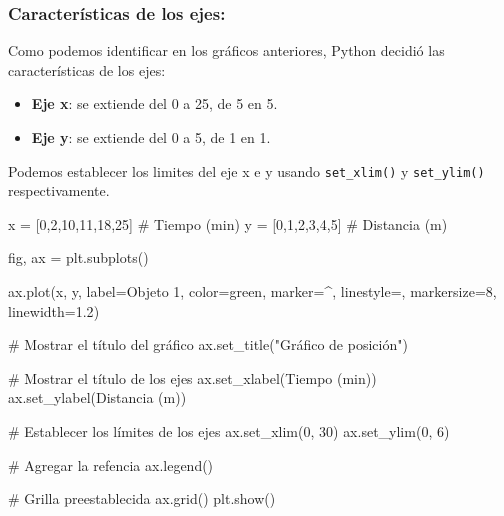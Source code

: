 \documentclass[
  letterpaper,
  DIV=11,
  numbers=noendperiod]{scrreprt}
\newenvironment{Shaded}{\begin{snugshade}}{\end{snugshade}}
\newcommand{\CommentTok}[1]{\textcolor[rgb]{0.37,0.37,0.37}{#1}}
\newcommand{\DecValTok}[1]{\textcolor[rgb]{0.68,0.00,0.00}{#1}}
\newcommand{\FloatTok}[1]{\textcolor[rgb]{0.68,0.00,0.00}{#1}}
\newcommand{\NormalTok}[1]{\textcolor[rgb]{0.00,0.23,0.31}{#1}}
\newcommand{\OperatorTok}[1]{\textcolor[rgb]{0.37,0.37,0.37}{#1}}
\newcommand{\StringTok}[1]{\textcolor[rgb]{0.13,0.47,0.30}{#1}}
\providecommand{\tightlist}{%
  \setlength{\itemsep}{0pt}\setlength{\parskip}{0pt}}\usepackage{longtable,booktabs,array}
\begin{document}
\subsubsection{Características de los
ejes:}\label{caracteruxedsticas-de-los-ejes}

Como podemos identificar en los gráficos anteriores, Python decidió las
características de los ejes:

\begin{itemize}
\tightlist
\item
  \textbf{Eje x}: se extiende del 0 a 25, de 5 en 5.
\item
  \textbf{Eje y}: se extiende del 0 a 5, de 1 en 1.
\end{itemize}

Podemos establecer los limites del eje x e y usando \texttt{set\_xlim()}
y \texttt{set\_ylim()} respectivamente.

\begin{Shaded}
\begin{Highlighting}[]
\NormalTok{x }\OperatorTok{=}\NormalTok{ [}\DecValTok{0}\NormalTok{,}\DecValTok{2}\NormalTok{,}\DecValTok{10}\NormalTok{,}\DecValTok{11}\NormalTok{,}\DecValTok{18}\NormalTok{,}\DecValTok{25}\NormalTok{]   }\CommentTok{\# Tiempo (min)}
\NormalTok{y }\OperatorTok{=}\NormalTok{ [}\DecValTok{0}\NormalTok{,}\DecValTok{1}\NormalTok{,}\DecValTok{2}\NormalTok{,}\DecValTok{3}\NormalTok{,}\DecValTok{4}\NormalTok{,}\DecValTok{5}\NormalTok{]       }\CommentTok{\# Distancia (m)}

\NormalTok{fig, ax }\OperatorTok{=}\NormalTok{ plt.subplots()}

\NormalTok{ax.plot(x, y, label}\OperatorTok{=}\StringTok{\textquotesingle{}Objeto 1\textquotesingle{}}\NormalTok{, color}\OperatorTok{=}\StringTok{\textquotesingle{}green\textquotesingle{}}\NormalTok{, marker}\OperatorTok{=}\StringTok{\textquotesingle{}\^{}\textquotesingle{}}\NormalTok{, linestyle}\OperatorTok{=}\StringTok{\textquotesingle{}{-}{-}\textquotesingle{}}\NormalTok{,}
\NormalTok{        markersize}\OperatorTok{=}\DecValTok{8}\NormalTok{, linewidth}\OperatorTok{=}\FloatTok{1.2}\NormalTok{)}

\CommentTok{\# Mostrar el título del gráfico}
\NormalTok{ax.set\_title(}\StringTok{"Gráfico de posición"}\NormalTok{)}

\CommentTok{\# Mostrar el título de los ejes}
\NormalTok{ax.set\_xlabel(}\StringTok{\textquotesingle{}Tiempo (min)\textquotesingle{}}\NormalTok{)}
\NormalTok{ax.set\_ylabel(}\StringTok{\textquotesingle{}Distancia (m)\textquotesingle{}}\NormalTok{)}

\CommentTok{\# Establecer los límites de los ejes}
\NormalTok{ax.set\_xlim(}\DecValTok{0}\NormalTok{, }\DecValTok{30}\NormalTok{)}
\NormalTok{ax.set\_ylim(}\DecValTok{0}\NormalTok{, }\DecValTok{6}\NormalTok{)}

\CommentTok{\# Agregar la refencia}
\NormalTok{ax.legend()}

\CommentTok{\# Grilla preestablecida}
\NormalTok{ax.grid()}
\NormalTok{plt.show()}
\end{Highlighting}
\end{Shaded}
\end{document}
